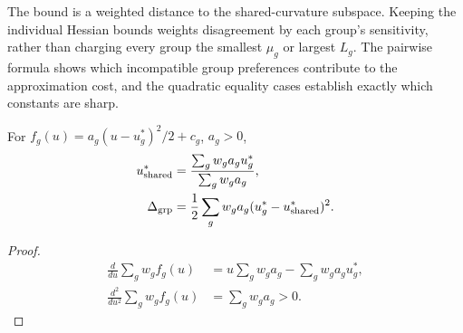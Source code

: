 The bound is a weighted distance to the shared-curvature subspace. Keeping the individual Hessian bounds weights disagreement by each group's sensitivity, rather than charging every group the smallest $\mu_g$ or largest $L_g$. The pairwise formula shows which incompatible group preferences contribute to the approximation cost, and the quadratic equality cases establish exactly which constants are sharp.

\begin{corollary}
For $f_g(u)=a_g(u-u_g^*)^2/2+c_g$, $a_g>0$,
\begin{align}
 u_{\rm shared}^*&=\frac{\sum_gw_ga_gu_g^*}{\sum_gw_ga_g},\\
 \Delta_{\rm grp}&=\frac12\sum_gw_ga_g(u_g^*-u_{\rm shared}^*)^2.
\end{align}
\end{corollary}
\begin{proof}
\begin{align}
 \frac d{du}\sum_gw_gf_g(u)&=u\sum_gw_ga_g-\sum_gw_ga_gu_g^*,\\
 \frac {d^2}{du^2}\sum_gw_gf_g(u)&=\sum_gw_ga_g>0.
\end{align}
\end{proof}
